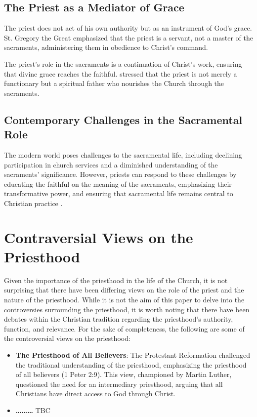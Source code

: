 \documentclass[12pt, doc]{apa7}   	%
\begin{document}
\subsection{The Priest as a Mediator of Grace}

The priest does not act of his own authority but as an instrument of God’s grace. St. Gregory the Great \citep{early_church_akin} emphasized that the priest is a servant, not a master of the sacraments, administering them in obedience to Christ’s command.

The priest’s role in the sacraments is a continuation of Christ’s work, ensuring that divine grace reaches the faithful. \citet{priesthood_shenouda} stressed that the priest is not merely a functionary but a spiritual father who nourishes the Church through the sacraments.

\subsection{Contemporary Challenges in the Sacramental Role}

The modern world poses challenges to the sacramental life, including declining participation in church services and a diminished understanding of the sacraments’ significance. However, priests can respond to these challenges by educating the faithful on the meaning of the sacraments, emphasizing their transformative power, and ensuring that sacramental life remains central to Christian practice \citep{eucharist_schmemann}.

\section{Contraversial Views on the Priesthood}
Given the importance of the priesthood in the life of the Church, it is not surprising that there have been differing views on the role of the priest and the nature of the priesthood. While it is not the aim of this paper to delve into the controversies surrounding the priesthood, it is worth noting that there have been debates within the Christian tradition regarding the priesthood’s authority, function, and relevance.  For the sake of completeness, the following are some of the controversial views on the priesthood:

\begin{itemize}
    \item \textbf{The Priesthood of All Believers}: The Protestant Reformation challenged the traditional understanding of the priesthood, emphasizing the priesthood of all believers (1 Peter 2:9). This view, championed by Martin Luther, questioned the need for an intermediary priesthood, arguing that all Christians have direct access to God through Christ.
    
    \item \textbf{\dots \dots \dots} TBC

\end{itemize}
\end{document}

